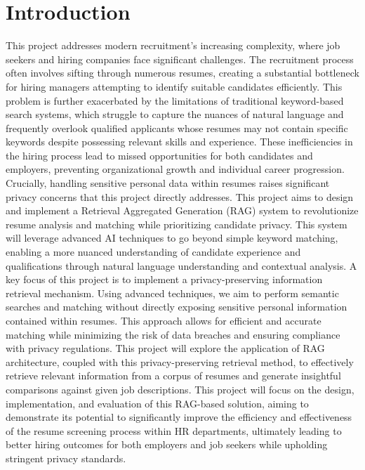 \documentclass[12pt]{report}
\begin{document}
\section{Introduction}

This project addresses modern recruitment's increasing complexity, where job seekers and hiring companies face significant challenges. The recruitment process often involves sifting through numerous resumes, creating a substantial bottleneck for hiring managers attempting to identify suitable candidates efficiently. This problem is further exacerbated by the limitations of traditional keyword-based search systems, which struggle to capture the nuances of natural language and frequently overlook qualified applicants whose resumes may not contain specific keywords despite possessing relevant skills and experience. These inefficiencies in the hiring process lead to missed opportunities for both candidates and employers, preventing organizational growth and individual career progression. Crucially, handling sensitive personal data within resumes raises significant privacy concerns that this project directly addresses. This project aims to design and implement a Retrieval Aggregated Generation (RAG) system to revolutionize resume analysis and matching while prioritizing candidate privacy. This system will leverage advanced AI techniques to go beyond simple keyword matching, enabling a more nuanced understanding of candidate experience and qualifications through natural language understanding and contextual analysis. A key focus of this project is to implement a privacy-preserving information retrieval mechanism. Using advanced techniques, we aim to perform semantic searches and matching without directly exposing sensitive personal information contained within resumes. This approach allows for efficient and accurate matching while minimizing the risk of data breaches and ensuring compliance with privacy regulations. 
This project will explore the application of RAG architecture, coupled with this privacy-preserving retrieval method, to effectively retrieve relevant information from a corpus of resumes and generate insightful comparisons against given job descriptions. This project will focus on the design, implementation, and evaluation of this RAG-based solution, aiming to demonstrate its potential to significantly improve the efficiency and effectiveness of the resume screening process within HR departments, ultimately leading to better hiring outcomes for both employers and job seekers while upholding stringent privacy standards. 
\end{document}
